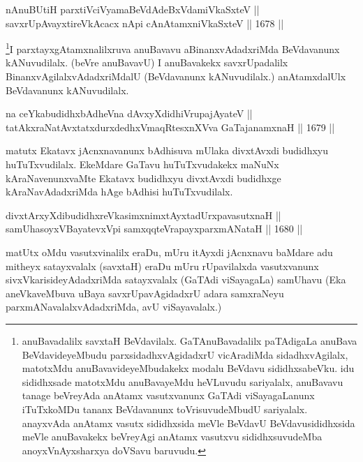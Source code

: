 
\begin{shl}
nAnuBUtiH parxtiVciVyamaBeVdAdeBxVdamiVkaSxteV || \\
savxrUpAvayxtireVkAcacx nApi cAnAtamxniVkaSxteV \hfill || 1678 ||  
\end{shl}

\begin{artha}
\footnote{anuBavadalilx savxtaH BeVdavilalx. GaTAnuBavadalilx paTAdigaLa anuBava BeVdavideyeMbudu parxsidadhxvAgidadxrU vicAradiMda sidadhxvAgilalx, matotxMdu anuBavavideyeMbudakekx modalu BeVdavu sididhxsabeVku. idu sididhxsade matotxMdu anuBavayeMdu heVLuvudu sariyalalx, anuBavavu tanage beVreyAda anAtamx vasutxvanunx GaTAdi viSayagaLanunx iTuTxkoMDu tananx BeVdavanunx toVrisuvudeMbudU sariyalalx. anayxvAda anAtamx vasutx sididhxsida meVle BeVdavU BeVdavusididhxsida meVle anuBavakekx beVreyAgi anAtamx vasutxvu sididhxsuvudeMba anoyxVnAyxsharxya doVSavu baruvudu.}I parxtayxgAtamxnalilxruva anuBavavu aBinanxvAdadxriMda BeVdavanunx kANuvudilalx. (beVre anuBavavU) I anuBavakekx savxrUpadalilx BinanxvAgilalxvAdadxriMdalU (BeVdavanunx kANuvudilalx.) anAtamxdalUlx BeVdavanunx kANuvudilalx. 
\end{artha}


\begin{shl}
na ceYkabudidhxbAdheVna dAvxyXdidhiVrupajAyateV || \\
tatAkxraNatAvxtatxdurxdedhxVmaqRtesxnXVva GaTajanamxnaH \hfill || 1679 ||  
\end{shl}

\begin{artha}
matutx Ekatavx jAcnxnavanunx bAdhisuva mUlaka divxtAvxdi budidhxyu huTuTxvudilalx. EkeMdare GaTavu huTuTxvudakekx maNuNx kAraNavenunxvaMte Ekatavx budidhxyu divxtAvxdi budidhxge kAraNavAdadxriMda hAge bAdhisi huTuTxvudilalx.
\end{artha}

\begin{shl}
divxtArxyXdibudidhxreVkasimxnimxtAyx\s tadUrxpavasutxnaH || \\
samUhasoyxVBayatevxV\s pi samxqqteVrapayxparxmANataH \hfill || 1680 ||  
\end{shl}

\begin{artha}
matUtx oMdu vasutxvinalilx eraDu, mUru itAyxdi jAcnxnavu baMdare adu mitheyx satayxvalalx (savxtaH) eraDu mUru rUpavilalxda vasutxvanunx sivxVkarisideyAdadxriMda satayxvalalx (GaTAdi viSayagaLa) samUhavu (Eka aneVkaveMbuva uBaya savxrUpavAgidadxrU adara samxraNeyu parxmANavalalxvAdadxriMda, avU viSayavalalx.)
\end{artha}


